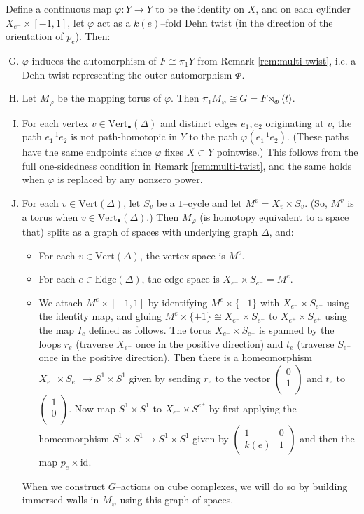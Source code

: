 \documentclass[11pt,oneside]{amsart}
\theoremstyle{definition}
\newcommand{\vertices}{\mathrm{Vert}}
\newcommand{\edges}{\mathrm{Edge}}
\newcommand*\colvec[2]{\ensuremath{\begin{pmatrix}#1\\#2\\\end{pmatrix}}}
\begin{document}
Define a continuous map $\varphi:Y\to Y$ to be the identity on $X$, and on each cylinder $X_{e^-}\times [-1,1]$, let $\varphi$ act as a $k(e)$--fold Dehn twist (in the direction of the orientation of $p_e$).  Then:
\begin{enumerate}[(A)]
\setcounter{enumi}{6}
    \item $\varphi$ induces the automorphism of $F\cong\pi_1Y$ from Remark \ref{rem:multi-twist}, i.e. a Dehn twist representing the outer automorphism $\Phi$. \label{item:multitwist-dehn}

    \item Let $M_\varphi$ be the mapping torus of $\varphi$.  Then $\pi_1M_\varphi\cong G=F\rtimes_\Phi\langle t\rangle$. \label{item:multitwist-mapping-torus}

    \item For each vertex $v\in\vertices_\bullet(\Delta)$ and distinct edges $e_1,e_2$ originating at $v$, the path $e_1^{-1}e_2$ is not path-homotopic in $Y$ to the path $\varphi(e_1^{-1}e_2)$.  (These paths have the same endpoints since $\varphi$ fixes $X\subset Y$ pointwise.)  This follows from the full one-sidedness condition in Remark \ref{rem:multi-twist}, and the same holds when $\varphi$ is replaced by any nonzero power. \label{item:multitwist-full}

    \item For each $v\in\vertices(\Delta)$, let $S_v$ be a $1$--cycle and let $M^v=X_v\times S_v$.  (So, $M^v$ is a torus when $v\in\vertices_\bullet(\Delta)$.)  Then $M_\varphi$ (is homotopy equivalent to a space that) splits as a graph of spaces with underlying graph $\Delta$, and:
    \begin{itemize}
        \item For each $v\in\vertices(\Delta)$, the vertex space is $M^v$.
        \item For each $e\in \edges(\Delta)$, the edge space is $X_{e^-}\times S_{e^-}=M^e$.
        \item We attach $M^e\times[-1,1]$ by identifying $M^e\times \{-1\}$ with $X_{e^-}\times S_{e^-}$ using the identity map, and gluing $M^e\times \{+1\}\cong X_{e^-}\times S_{e^-}$ to $X_{e^+}\times S_{e^+}$ using the map $I_e$ defined as follows.  The torus $X_{e^-}\times S_{e^-}$ is spanned by the loops $r_e$ (traverse $X_{e^-}$ once in the positive direction) and $t_e$ (traverse $S_{e^-}$ once in the positive direction).  Then there is a homeomorphism $X_{e^-}\times S_{e^-}\to S^1\times S^1$ given by sending $r_e$ to the vector $\colvec{0}{1}$ and $t_e$ to $\colvec{1}{0}$.  Now map $S^1\times S^1$ to $X_{e^+}\times S^{e^+}$ by first applying the homeomorphism $S^1\times S^1\to S^1\times S^1$ given by $\begin{pmatrix}
            1&0\\
            k(e)&1
        \end{pmatrix}$
        and then the map $p_e\times \mathrm{id}$.\label{item:multitwist-decomp}
    \end{itemize}
When we construct $G$--actions on cube complexes, we will do so by building immersed walls in $M_\varphi$ using this graph of spaces.
\end{enumerate}
\end{document}
